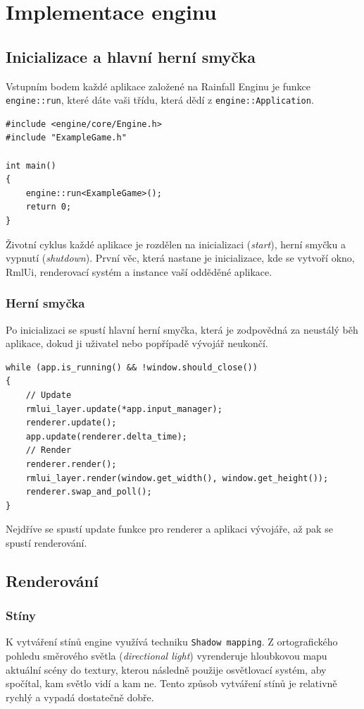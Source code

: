 \documentclass[12pt,a4paper]{article}
\begin{document}
\section{Implementace enginu}

\subsection{Inicializace a hlavní herní smyčka}

Vstupním bodem každé aplikace založené na Rainfall Enginu je funkce \texttt{engine::run}, které dáte vaši třídu, která dědí z \texttt{engine::Application}.

\begin{lstlisting}[caption={Vstupní bod aplikace}]
#include <engine/core/Engine.h>
#include "ExampleGame.h"

int main()
{
    engine::run<ExampleGame>();
    return 0;
}
\end{lstlisting}

Životní cyklus každé aplikace je rozdělen na inicializaci (\textit{start}), herní smyčku a vypnutí (\textit{shutdown}).
První věc, která nastane je inicializace, kde se vytvoří okno, RmlUi, renderovací systém a instance vaší odděděné aplikace.

\subsubsection{Herní smyčka}
Po inicializaci se spustí hlavní herní smyčka, která je zodpovědná za neustálý běh aplikace, dokud ji uživatel nebo popřípadě vývojář neukončí.

\begin{lstlisting}[caption={Herní smyčka}]
while (app.is_running() && !window.should_close())
{
    // Update
    rmlui_layer.update(*app.input_manager);
    renderer.update();
    app.update(renderer.delta_time);
    // Render
    renderer.render();
    rmlui_layer.render(window.get_width(), window.get_height());
    renderer.swap_and_poll();
}
\end{lstlisting}

Nejdříve se spustí update funkce pro renderer a aplikaci vývojáře, až pak se spustí renderování.


\subsection{Renderování}
\subsubsection{Stíny}
K vytváření stínů engine využívá techniku \texttt{Shadow mapping}. Z ortografického pohledu směrového světla (\textit{directional light}) vyrenderuje hloubkovou mapu aktuální scény do textury, kterou následně použije osvětlovací systém, aby spočítal, kam světlo vidí a kam ne. Tento způsob vytváření stínů je relativně rychlý a vypadá dostatečně dobře.
\end{document}
